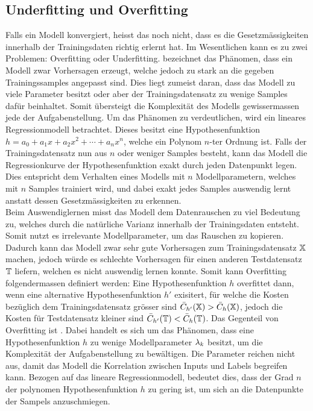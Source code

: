 \subsection{Underfitting und Overfitting}\label{sec:overfitting}
Falls ein Modell konvergiert, heisst das noch nicht, dass es die
Gesetzmässigkeiten innerhalb der Trainingsdaten richtig erlernt hat.
Im Wesentlichen kann es zu zwei Problemen: Overfitting oder Underfitting.
\para{}
 bezeichnet das Phänomen, dass ein Modell zwar Vorhersagen
erzeugt, welche jedoch zu stark an die gegeben Trainingssamples angepasst sind.
Dies liegt zumeist daran, dass das Modell zu viele Parameter besitzt oder
aber der Trainingsdatensatz zu wenige Samples dafür beinhaltet.
Somit übersteigt die Komplexität des Modells gewissermassen jede der Aufgabenstellung.
\para{}
Um das Phänomen zu verdeutlichen, wird ein lineares Regressionmodell betrachtet.
Dieses besitzt eine Hypothesenfunktion $h = a_0 + a_1 x + a_2 x^2 + \cdots + a_n
x^n$, welche ein Polynom $n$-ter Ordnung ist. Falls der
Trainingsdatensatz nun aus $n$ oder weniger Samples besteht, kann das Modell die
Regressionkurve der Hypothesenfunktion exakt durch jeden Datenpunkt legen.
Dies entspricht dem Verhalten eines Modells mit $n$ Modellparametern, welches
mit $n$ Samples trainiert wird, und dabei exakt jedes Samples auswendig lernt anstatt
dessen Gesetzmässigkeiten zu erkennen. \\
Beim Auswendiglernen misst das Modell dem Datenrauschen zu viel Bedeutung zu, welches durch die natürliche Varianz
innerhalb der Trainingsdaten entsteht. Somit nutzt es
irrelevante Modellparameter, um das Rauschen zu kopieren. \\
Dadurch kann das Modell zwar sehr gute Vorhersagen zum Trainingsdatensatz
$\mathbb{X}$ machen, jedoch würde es schlechte Vorhersagen für einen
anderen Testdatensatz $\mathbb{T}$ liefern, welchen es nicht auswendig lernen konnte.
\para{}
Somit kann Overfitting folgendermassen definiert werden: Eine
Hypothesenfunktion $h$ overfittet dann, wenn eine alternative Hypothesenfunktion
$h'$ exisitert, für welche die Kosten bezüglich dem Trainingsdatensatz
grösser sind $\bar{C}_{h'}(\mathbb{X}) > \bar{C}_h(\mathbb{X})$, jedoch die Kosten
für Testdatensatz kleiner sind $\bar{C}_{h'}(\mathbb{T}) < \bar{C}_h(\mathbb{T})$.
\para{}
Das Gegenteil von Overfitting ist . Dabei handelt es sich um das Phänomen, dass eine
Hypothesenfunktion $h$ zu
wenige Modellparameter $\lambda_k$ besitzt, um die Komplexität der Aufgabenstellung zu bewältigen.
Die Parameter reichen nicht aus, damit das Modell die Korrelation zwischen
Inputs und Labels begreifen kann.
\para{}
Bezogen auf das lineare Regressionmodell, bedeutet dies, dass der Grad $n$ der
polynomen Hypothesenfunktion $h$ zu gering ist, um sich an die Datenpunkte der
Sampels anzuschmiegen.

